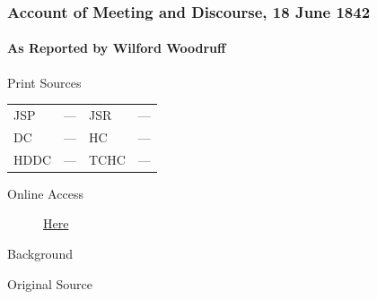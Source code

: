 		\subsubsection{Account of Meeting and Discourse, 18 June 1842}
			\label{EMS-1842-JS-18-JUN-1842}
			
			\paragraph{As Reported by Wilford Woodruff}
				\label{EMS-1842-JS-18-JUN-1842-WW}
			
				\begin{description}
					\item[Print Sources]
				\end{description}

				\begin{tabular}{p{0.5in}p{1in}p{0.5in}p{1in}}
					JSP	 	& ---		& JSR 		& --- \\
					DC	 	& ---		& HC 		& --- \\
					HDDC 	& ---		& TCHC 		& --- \\
				\end{tabular}
				
				\begin{description}
					\item[Online Access] \href{https://www.josephsmithpapers.org/paper-summary/account-of-meeting-and-discourse-18-june-1842-as-reported-by-wilford-woodruff/1}{Here}
				\end{description}
				
				\begin{description}
					\item[Background]
				\end{description}
				
				
				\begin{description}
					\item[Original Source]
				\end{description}
				
